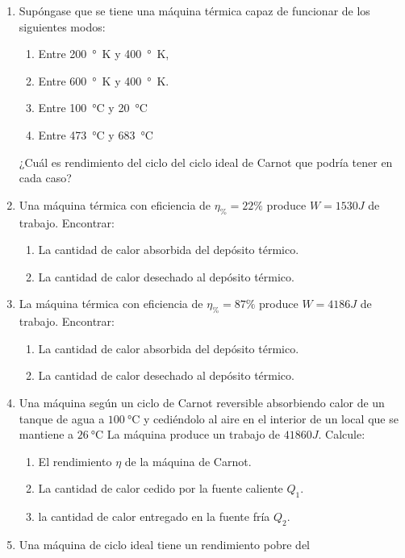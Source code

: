 \documentclass[../main]{subfiles}
\begin{document}
\begin{enumerate}
  \item Supóngase que se tiene una máquina térmica capaz de funcionar
    de los siguientes modos:
    \begin{enumerate}
      \item Entre \qty{200}{\degree\kelvin}  y \SI{400}{\degree\kelvin},
      \item Entre \SI{600}{\degree\kelvin} y \SI{400}{\degree\kelvin}.
      \item Entre \SI{100}{\celsius} y \SI{20}{\celsius}
      \item Entre \SI{473}{\celsius} y \SI{683}{\celsius}
    \end{enumerate}
    ¿Cuál es rendimiento del ciclo del ciclo ideal de Carnot que
    podría tener en cada caso?
  \item Una máquina térmica con eficiencia de $\eta_{\%}=22\%$
    produce $W=1530J$ de trabajo. Encontrar:
    \begin{enumerate}
      \item La cantidad de calor absorbida del depósito térmico.
      \item La cantidad de calor desechado al depósito térmico.
    \end{enumerate}
  \item La máquina térmica con eficiencia de $\eta_{\%}=87\%$ produce
    $W=4186J$ de trabajo. Encontrar:
    \begin{enumerate}
      \item La cantidad de calor absorbida del depósito térmico.
      \item La cantidad de calor desechado al depósito térmico.
    \end{enumerate}
  \item Una máquina según un ciclo de Carnot reversible absorbiendo
    calor de un tanque de agua a $\SI{100}{\celsius}$ y cediéndolo al
    aire en el interior de un local que se mantiene a
    $\SI{26}{\celsius}$ La máquina produce un trabajo de $41860J$. Calcule:
    \begin{enumerate}
      \item El rendimiento $\eta$ de la máquina de Carnot.
      \item La cantidad de calor cedido por la fuente caliente $Q_1$.
      \item la cantidad de calor entregado en la fuente fría $Q_2$.
    \end{enumerate}
  \item Una máquina de ciclo ideal tiene un rendimiento pobre del

\end{enumerate}
\end{document}
